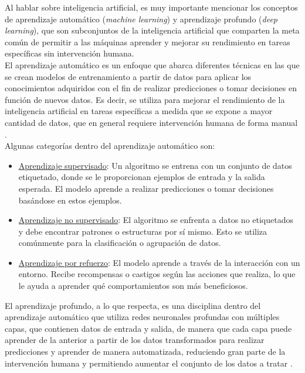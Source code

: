 Al hablar sobre inteligencia artificial, es muy importante mencionar los conceptos de aprendizaje automático (\textit{machine learning}) y aprendizaje profundo (\textit{deep learning}), que son subconjuntos de la inteligencia artificial que comparten la meta común de permitir a las máquinas aprender y mejorar su rendimiento en tareas específicas sin intervención humana.\\

El aprendizaje automático es un enfoque que abarca diferentes técnicas en las que se crean modelos de entrenamiento a partir de datos para aplicar los conocimientos adquiridos con el fin de realizar predicciones o tomar decisiones en función de nuevos datos. Es decir, se utiliza para mejorar el rendimiento de la inteligencia artificial en tareas específicas a medida que se expone a mayor cantidad de datos, que en general requiere intervención humana de forma manual \citep{MicrosoftIA}.\\

Algunas categorías dentro del aprendizaje automático son:
\begin{itemize}
	\item \underline{ Aprendizaje supervisado}: Un algoritmo se entrena con un conjunto de datos etiquetado, donde se le proporcionan ejemplos de entrada y la salida esperada. El modelo aprende a realizar predicciones o tomar decisiones basándose en estos ejemplos.
	\item \underline{ Aprendizaje no supervisado}: El algoritmo se enfrenta a datos no etiquetados y debe encontrar patrones o estructuras por sí mismo. Esto se utiliza comúnmente para la clasificación o agrupación de datos.
	\item \underline{ Aprendizaje por refuerzo}: El modelo aprende a través de la interacción con un entorno. Recibe recompensas o castigos según las acciones que realiza, lo que le ayuda a aprender qué comportamientos son más beneficiosos.\\
\end{itemize}


El aprendizaje profundo, a lo que respecta, es una disciplina dentro del aprendizaje automático que utiliza redes neuronales profundas con múltiples capas, que contienen datos de entrada y salida, de manera que cada capa puede aprender de la anterior a partir de los datos transformados para realizar predicciones y aprender de manera automatizada, reduciendo gran parte de la intervención humana y permitiendo aumentar el conjunto de los datos a tratar \citep{MicrosoftIA}.\\

